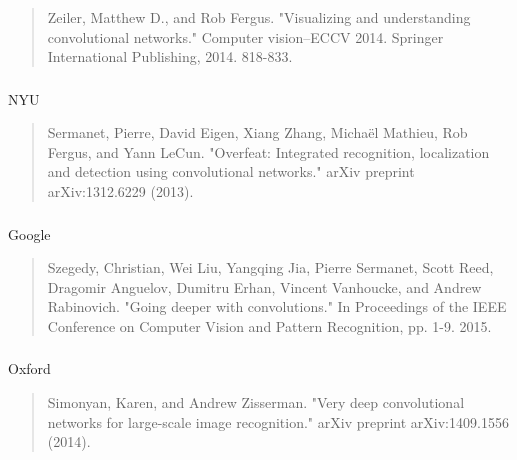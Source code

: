 \documentclass[xetex,mathserif,serif,aspectratio=169]{beamer}
\begin{document}
\begin{frame}[fragile] \frametitle{} \oldB \small



\begin{quote}
Zeiler, Matthew D., and Rob Fergus. "Visualizing and understanding convolutional networks." Computer vision–ECCV 2014. Springer International Publishing, 2014. 818-833.
\end{quote}


\end{frame}

\begin{frame}[fragile] \frametitle{} \oldB \small


NYU
\begin{quote}
Sermanet, Pierre, David Eigen, Xiang Zhang, Michaël Mathieu, Rob Fergus, and Yann LeCun. "Overfeat: Integrated recognition, localization and detection using convolutional networks." arXiv preprint arXiv:1312.6229 (2013).
\end{quote}


\end{frame}

\begin{frame}[fragile] \frametitle{} \oldB \small


Google
\begin{quote}
Szegedy, Christian, Wei Liu, Yangqing Jia, Pierre Sermanet, Scott Reed, Dragomir Anguelov, Dumitru Erhan, Vincent Vanhoucke, and Andrew Rabinovich. "Going deeper with convolutions." In Proceedings of the IEEE Conference on Computer Vision and Pattern Recognition, pp. 1-9. 2015.
\end{quote}


\end{frame}

\begin{frame}[fragile] \frametitle{} \oldB \small


Oxford
\begin{quote}
Simonyan, Karen, and Andrew Zisserman. "Very deep convolutional networks for large-scale image recognition." arXiv preprint arXiv:1409.1556 (2014).
\end{quote}


\end{frame}
\end{document}
